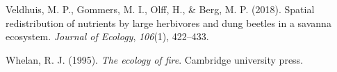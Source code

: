 \documentclass[
  11pt,
  a4paper]{book}
\newlength{\cslhangindent}
\newlength{\cslentryspacingunit} %
\newenvironment{CSLReferences}[2] %
 {%
  \setlength{\parindent}{0pt}
  \ifodd #1
  \let\oldpar\par
  \def\par{\hangindent=\cslhangindent\oldpar}
  \fi
  \setlength{\parskip}{#2\cslentryspacingunit}
 }%
 {}
\begin{document}
\begin{CSLReferences}{1}{0}
\leavevmode{}%
Veldhuis, M. P., Gommers, M. I., Olff, H., \& Berg, M. P. (2018). Spatial redistribution of nutrients by large herbivores and dung beetles in a savanna ecosystem. \emph{Journal of Ecology}, \emph{106}(1), 422--433.

\leavevmode{}%
Whelan, R. J. (1995). \emph{The ecology of fire}. Cambridge university press.

\end{CSLReferences}
\end{document}

